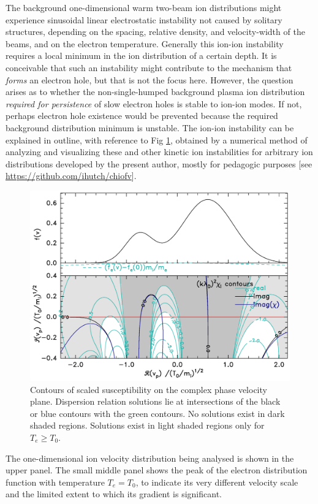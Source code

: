 \documentclass[pre]{revtex4-2}
\begin{document}
The background one-dimensional warm two-beam ion distributions might
experience sinusoidal linear electrostatic instability not caused by
solitary structures, depending on the spacing, relative density, and
velocity-width of the beams, and on the electron
temperature\cite{Stringer1964,Fried1966}. Generally this ion-ion
instability requires a local minimum in the ion distribution of a
certain depth. It is conceivable that such an instability might
contribute to the mechanism that \emph{forms} an electron hole, but
that is not the focus here. However, the question arises as to whether
the non-single-humped background plasma ion distribution
\emph{required for persistence} of slow electron holes is stable to
ion-ion modes. If not, perhaps electron hole existence would be
prevented because the required background distribution minimum is
unstable. The ion-ion instability can be explained in outline, with reference
to Fig \ref{fig:ionstability}, obtained by a numerical method of
analyzing and visualizing these and other kinetic ion instabilities
for arbitrary ion distributions developed by the present author,
mostly for pedagogic purposes [see
\url{https://github.com/ihutch/chiofv}].
\begin{figure}[htp]
  \centering
  \includegraphics[width=.7\hsize]{ionstabplot}
  \caption{Contours of scaled susceptibility on the complex phase
    velocity plane. Dispersion relation solutions lie at
    intersections of the black or blue contours with the green
    contours. No solutions exist in dark shaded regions. Solutions
    exist in light shaded regions only for $T_e\ge T_0$.}
  \label{fig:ionstability}
\end{figure}
The one-dimensional ion velocity distribution being analysed is shown
in the upper panel. The small middle panel shows the peak of the
electron distribution function with temperature $T_e=T_0$, to indicate
its very different velocity scale and the limited extent to which its gradient
is significant. 
\end{document}
